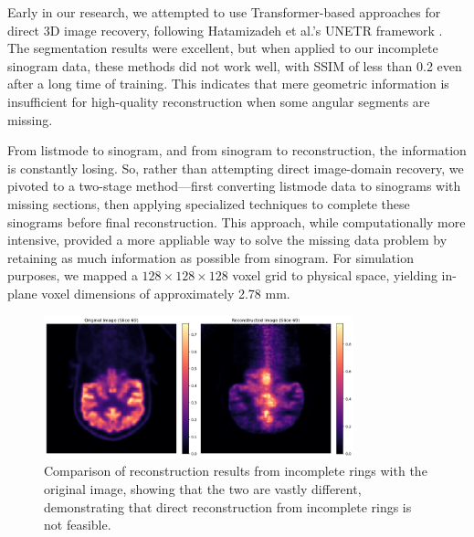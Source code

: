 \documentclass[
reprint,
superscriptaddress,
nofootinbib,
amsmath,amssymb,
aps,
prd,
]{revtex4-2}
\begin{document}
Early in our research, we attempted to use Transformer-based approaches for direct 3D image recovery, following Hatamizadeh et al.'s UNETR framework \cite{hatamizadeh2021unetrtransformers3dmedical}. The segmentation results were excellent, but when applied to our incomplete sinogram data, these methods did not work well, with SSIM of less than 0.2 even after a long time of training. This indicates that mere geometric information is insufficient for high-quality reconstruction when some angular segments are missing. 



From listmode to sinogram, and from sinogram to reconstruction, the information is constantly losing. So, rather than attempting direct image-domain recovery, we pivoted to a two-stage method—first converting listmode data to sinograms with missing sections, then applying specialized techniques to complete these sinograms before final reconstruction. This approach, while computationally more intensive, provided a more appliable way to solve the missing data problem by retaining as much information as possible from sinogram.
For simulation purposes, we mapped a $128\times128\times128$ voxel grid to physical space, yielding in-plane voxel dimensions of approximately 2.78 mm.


\begin{figure}[htbp]
    \centering
    \vspace{-0.2cm}
    \includegraphics[width=0.8\textwidth]{Images/output2}
    \vspace{-0.2cm}
    \caption{Comparison of reconstruction results from incomplete rings with the original image, showing that the two are vastly different, demonstrating that direct reconstruction from incomplete rings is not feasible.}
    \vspace{-0.2cm}
    \label{fig:pet_incomplete_reconstruction}
\end{figure}
\end{document}
